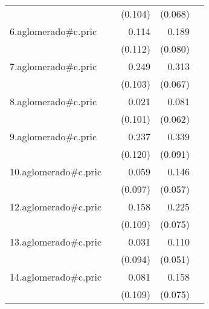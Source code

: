 {\begin{longtable}{l*{4}{D{.}{.}{-1}}}
            &                     &     (0.104)         &     (0.068)         &                     \\
\addlinespace
6.aglomerado#c.pric&                     &       0.114         &       0.189\sym{*}  &                     \\
            &                     &     (0.112)         &     (0.080)         &                     \\
\addlinespace
7.aglomerado#c.pric&                     &       0.249\sym{*}  &       0.313\sym{***}&                     \\
            &                     &     (0.103)         &     (0.067)         &                     \\
\addlinespace
8.aglomerado#c.pric&                     &       0.021         &       0.081         &                     \\
            &                     &     (0.101)         &     (0.062)         &                     \\
\addlinespace
9.aglomerado#c.pric&                     &       0.237\sym{*}  &       0.339\sym{***}&                     \\
            &                     &     (0.120)         &     (0.091)         &                     \\
\addlinespace
10.aglomerado#c.pric&                     &       0.059         &       0.146\sym{*}  &                     \\
            &                     &     (0.097)         &     (0.057)         &                     \\
\addlinespace
12.aglomerado#c.pric&                     &       0.158         &       0.225\sym{**} &                     \\
            &                     &     (0.109)         &     (0.075)         &                     \\
\addlinespace
13.aglomerado#c.pric&                     &       0.031         &       0.110\sym{*}  &                     \\
            &                     &     (0.094)         &     (0.051)         &                     \\
\addlinespace
14.aglomerado#c.pric&                     &       0.081         &       0.158\sym{*}  &                     \\
            &                     &     (0.109)         &     (0.075)         &                     \\

\end{longtable}}
